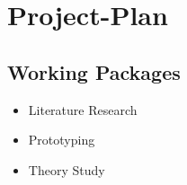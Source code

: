 \section{Project-Plan}

\subsection{Working Packages}

\begin{itemize}
\item Literature Research
\item Prototyping
\item Theory Study
\end{itemize}